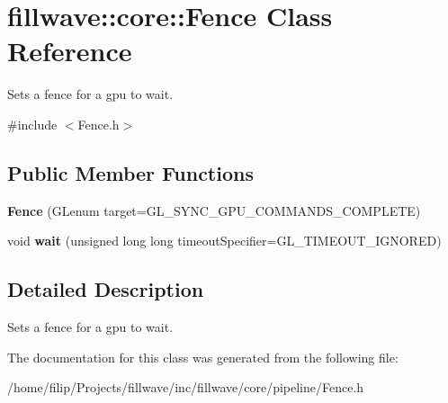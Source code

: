 \hypertarget{classfillwave_1_1core_1_1Fence}{}\section{fillwave\+:\+:core\+:\+:Fence Class Reference}
\label{classfillwave_1_1core_1_1Fence}


Sets a fence for a gpu to wait.  




{\ttfamily \#include $<$Fence.\+h$>$}

\subsection*{Public Member Functions}
\begin{DoxyCompactItemize}
\item 
\hypertarget{classfillwave_1_1core_1_1Fence_a0fc91f6b1c08d750e63fbe1c09c3ab5b}{}{\bfseries Fence} (G\+Lenum target=G\+L\+\_\+\+S\+Y\+N\+C\+\_\+\+G\+P\+U\+\_\+\+C\+O\+M\+M\+A\+N\+D\+S\+\_\+\+C\+O\+M\+P\+L\+E\+T\+E)\label{classfillwave_1_1core_1_1Fence_a0fc91f6b1c08d750e63fbe1c09c3ab5b}

\item 
\hypertarget{classfillwave_1_1core_1_1Fence_a852e254cea189d2275a035bfc1c73e17}{}void {\bfseries wait} (unsigned long long timeout\+Specifier=G\+L\+\_\+\+T\+I\+M\+E\+O\+U\+T\+\_\+\+I\+G\+N\+O\+R\+E\+D)\label{classfillwave_1_1core_1_1Fence_a852e254cea189d2275a035bfc1c73e17}

\end{DoxyCompactItemize}


\subsection{Detailed Description}
Sets a fence for a gpu to wait. 

The documentation for this class was generated from the following file\+:\begin{DoxyCompactItemize}
\item 
/home/filip/\+Projects/fillwave/inc/fillwave/core/pipeline/Fence.\+h\end{DoxyCompactItemize}
